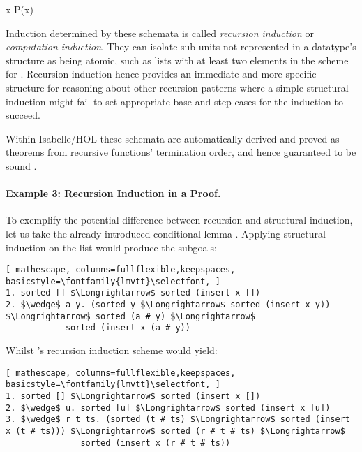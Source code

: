   {\forall x \;\; P\;(x)}

\vspace{2 mm}

Induction determined by these schemata is called \emph{recursion induction} or \emph{computation induction}.
%
They can isolate sub-units not represented in a datatype's structure as being atomic, such as lists with at least two elements in the scheme for .
%
Recursion induction hence provides an immediate and more specific structure for reasoning about other recursion patterns where a simple structural induction might fail to set appropriate base and step-cases for the induction to succeed.

Within Isabelle/HOL these schemata are automatically derived and proved as theorems from recursive functions' termination order, and hence guaranteed to be sound \cite{krauss-term}. 

\paragraph*{Example 3: Recursion Induction in a Proof.}


To exemplify the potential difference between recursion and structural induction, let us take the already introduced conditional lemma .
%
Applying structural induction on the list  would produce the subgoals:

\begin{lstlisting}[ mathescape, columns=fullflexible,keepspaces, basicstyle=\fontfamily{lmvtt}\selectfont, ]
1. sorted [] $\Longrightarrow$ sorted (insert x [])
2. $\wedge$ a y. (sorted y $\Longrightarrow$ sorted (insert x y)) $\Longrightarrow$ sorted (a # y) $\Longrightarrow$
            sorted (insert x (a # y))
\end{lstlisting}

\noindent Whilst 's recursion induction scheme would yield:

\begin{lstlisting}[ mathescape, columns=fullflexible,keepspaces, basicstyle=\fontfamily{lmvtt}\selectfont, ]
1. sorted [] $\Longrightarrow$ sorted (insert x [])
2. $\wedge$ u. sorted [u] $\Longrightarrow$ sorted (insert x [u])
3. $\wedge$ r t ts. (sorted (t # ts) $\Longrightarrow$ sorted (insert x (t # ts))) $\Longrightarrow$ sorted (r # t # ts) $\Longrightarrow$
               sorted (insert x (r # t # ts))
\end{lstlisting}


